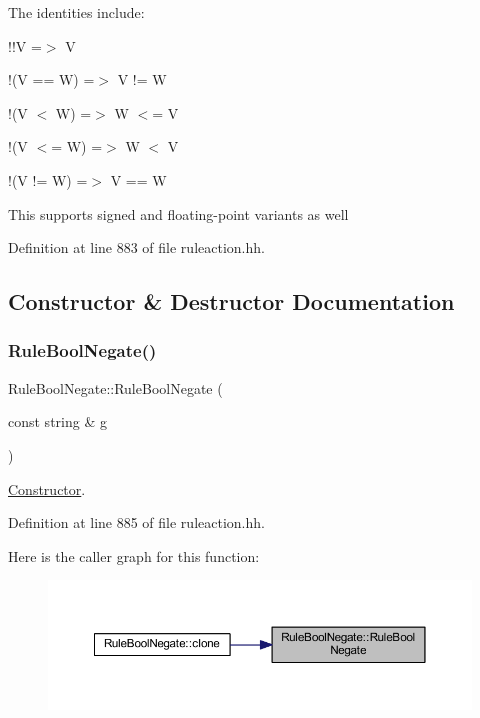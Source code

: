 The identities include\+:
\begin{DoxyItemize}
\item {\ttfamily !!V =$>$ V}
\item {\ttfamily !(V == W) =$>$ V != W}
\item {\ttfamily !(V $<$ W) =$>$ W $<$= V}
\item {\ttfamily !(V $<$= W) =$>$ W $<$ V}
\item {\ttfamily !(V != W) =$>$ V == W}
\end{DoxyItemize}

This supports signed and floating-\/point variants as well 

Definition at line 883 of file ruleaction.\+hh.



\subsection{Constructor \& Destructor Documentation}
\mbox{\label{class_rule_bool_negate_a4746885371315943fe28ddf66a5794fc}} 
\subsubsection{\texorpdfstring{RuleBoolNegate()}{RuleBoolNegate()}}
{\footnotesize\ttfamily Rule\+Bool\+Negate\+::\+Rule\+Bool\+Negate (\begin{DoxyParamCaption}\item[{const string \&}]{g }\end{DoxyParamCaption})\hspace{0.3cm}{\ttfamily [inline]}}



\mbox{\hyperlink{class_constructor}{Constructor}}. 



Definition at line 885 of file ruleaction.\+hh.

Here is the caller graph for this function\+:
\nopagebreak
\begin{figure}[H]
\begin{center}
\leavevmode
\includegraphics[width=350pt]{class_rule_bool_negate_a4746885371315943fe28ddf66a5794fc_icgraph}
\end{center}
\end{figure}


